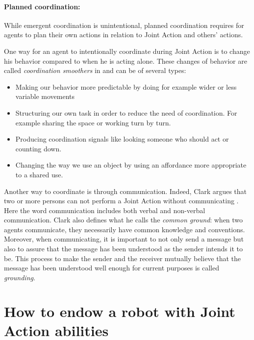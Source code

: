 \documentclass[english,a4paper,11pt,twoside]{StyleThese}
\begin{document}
\paragraph{Planned coordination:} 
While emergent coordination is unintentional, planned coordination requires for agents to plan their own actions in relation to Joint Action and others' actions.

One way for an agent to intentionally coordinate during Joint Action is to change his behavior compared to when he is acting alone. These changes of behavior are called \textit{coordination smoothers} in \cite{vesper2010minimal} and can be of several types:
\begin{itemize}
\item Making our behavior more predictable by doing for example wider or less variable movements
\item Structuring our own task in order to reduce the need of coordination. For example sharing the space or working turn by turn.
\item Producing coordination signals like looking someone who should act or counting down.
\item Changing the way we use an object by using an affordance more appropriate to a shared use.
\end{itemize}

Another way to coordinate is through communication. Indeed, Clark argues that two or more persons can not perform a Joint Action without communicating \cite{clark1996using}. Here the word communication includes both verbal and non-verbal communication. Clark also defines what he calls the \textit{common ground}: when two agents communicate, they necessarily have common knowledge and conventions. Moreover, when communicating, it is important to not only send a message but also to assure that the message has been understood as the sender intends it to be. This process to make the sender and the receiver mutually believe that the message has been understood well enough for current purposes is called \textit{grounding}.


\section{How to endow a robot with Joint Action abilities}
\end{document}
